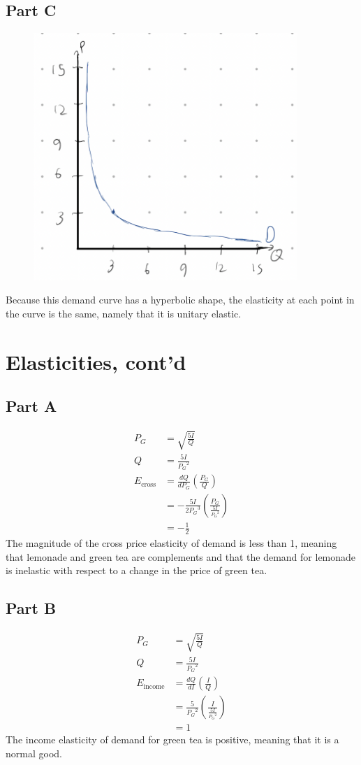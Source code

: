 \documentclass[8pt]{extarticle}
\newcommand{\plain}[1]{\textrm{#1}}
\begin{document}
{\subsection*{Part C}
\begin{figure}[h]
	\centering
	\includegraphics[width=10cm]{HW2Q2C}
\end{figure}
\noindent Because this demand curve has a hyperbolic shape, the elasticity at each point in the curve is the same, namely that it is unitary elastic.
\section*{Elasticities, cont'd}
\subsection*{Part A}
\begin{align*}
	P_G &= \sqrt{\frac{5I}{Q}}\\
	Q &= \frac{5I}{{P_G}^2}\\
	E_{\plain{cross}} &= \frac{dQ}{dP_G}\left(\frac{P_G}{Q}\right)\\
	&= -\frac{5I}{2{P_G}^3}\left(\frac{P_G}{\frac{5I}{{P_G}^2}}\right)\\
	&= \boxed{-\frac{1}{2}}
\end{align*}
The magnitude of the cross price elasticity of demand is less than 1, meaning that lemonade and green tea are complements and that the demand for lemonade is inelastic with respect to a change in the price of green tea.
\subsection*{Part B}
\begin{align*}
	P_G &= \sqrt{\frac{5I}{Q}}\\
	Q &= \frac{5I}{{P_G}^2}\\
	E_{\plain{income}} &= \frac{dQ}{dI}\left(\frac{I}{Q}\right)\\
	&= \frac{5}{{P_G}^2}\left(\frac{I}{\frac{5I}{{P_G}^2}}\right)\\
	&= 1
\end{align*}
The income elasticity of demand for green tea is positive, meaning that it is a normal good.
}
\end{document}
